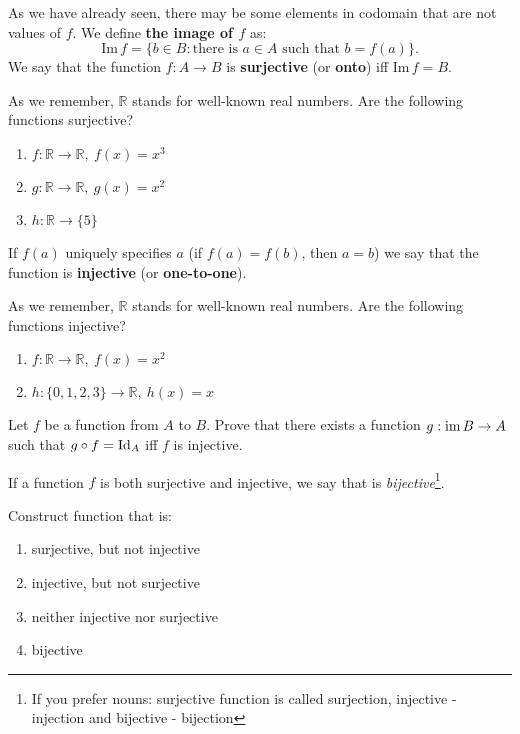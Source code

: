 \noindent As we have already seen, there may be some elements in codomain that are not values of
$f$. We define \textbf{the image of $f$} as:
$$\text{Im}\, f = \{b\in B : \text{there is } a\in A \text{ such that } b=f(a)\}.$$
We say that the function $f: A\to B$ is \textbf{surjective} (or \textbf{onto}) iff $\text{Im}\,f=B$.

\begin{prob}
	As we remember, $\mathbb{R}$ stands for well-known real numbers. Are the following functions surjective?
	\begin{enumerate}
		\item $f: \mathbb{R} \to \mathbb{R}, ~f(x)=x^3$
		\item $g: \mathbb{R} \to \mathbb{R}, ~g(x)=x^2$
		\item $h: \mathbb{R} \to \{5\}$
	\end{enumerate}
\end{prob}

If $f(a)$ uniquely specifies $a$ (if $f(a)=f(b)$, then $a=b$) we say that the function is \textbf{injective}
(or \textbf{one-to-one}).
\begin{exercise}
	As we remember, $\mathbb{R}$ stands for well-known real numbers. Are the following functions injective?
	\begin{enumerate}
		\item $f: \mathbb{R} \to \mathbb R, ~f(x)=x^2$
		\item $h: \{0,1,2,3\} \to \mathbb R, ~h(x)=x$
	\end{enumerate}
\end{exercise}

\begin{exercise}
Let $f$ be a function from $A$ to $B$. Prove that there exists a function $g: \text{im\,} B\to A$ such that $g\circ f=\text{Id}_A$ iff $f$ is injective. 
\end{exercise}

If a function $f$ is both surjective and injective, we say that is \textit{bijective}\footnote{If you prefer nouns: surjective function is called surjection, injective - injection
and bijective - bijection}.

\begin{prob}
	Construct function that is:
	\begin{enumerate}
		\item surjective, but not injective
		\item injective, but not surjective
		\item neither injective nor surjective
		\item bijective
	\end{enumerate}
\end{prob}

